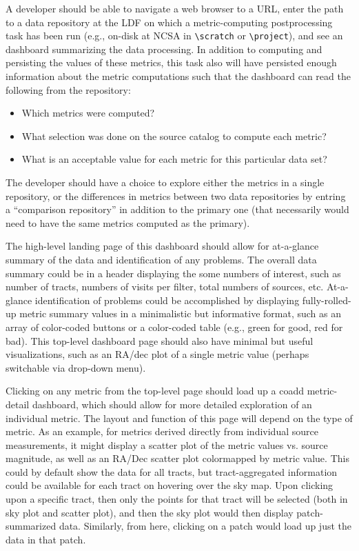 A developer should be able to navigate a web browser to a URL, enter the path to a data repository at the LDF on which a metric-computing postprocessing task has been run (e.g., on-disk at NCSA in \texttt{\textbackslash scratch} or \texttt{\textbackslash project}), and see an dashboard summarizing the data processing.
In addition to computing and persisting the values of these metrics, this task also will have persisted enough information about the metric computations such that the dashboard can read the following from the repository:
\begin{itemize}
    \item Which metrics were computed?
    \item What selection was done on the source catalog to compute each metric?
    \item What is an acceptable value for each metric for this particular data set?
\end{itemize}
The developer should have a choice to explore either the metrics in a single repository, or the differences in metrics between two data repositories by entring a ``comparison repository'' in addition to the primary one (that necessarily would need to have the same metrics computed as the primary).

The high-level landing page of this dashboard should allow for at-a-glance summary of the data and identification of any problems.
The overall data summary could be in a header displaying the some numbers of interest, such as number of tracts, numbers of visits per filter, total numbers of sources, etc.
At-a-glance identification of problems could be accomplished by displaying fully-rolled-up metric summary values in a minimalistic but informative format, such as an array of color-coded buttons or a color-coded table (e.g., green for good, red for bad).
This top-level dashboard page should also have minimal but useful visualizations, such as an RA/dec plot of a single metric value (perhaps switchable via drop-down menu).

Clicking on any metric from the top-level page should load up a coadd metric-detail dashboard, which should allow for more detailed exploration of an individual metric.
The layout and function of this page will depend on the type of metric.
As an example, for metrics derived directly from individual source measurements, it might display a scatter plot of the metric values vs. source magnitude, as well as an RA/Dec scatter plot colormapped by metric value.
This could by default show the data for all tracts, but tract-aggregated information could be available for each tract on hovering over the sky map.
Upon clicking upon a specific tract, then only the points for that tract will be selected (both in sky plot and scatter plot), and then the sky plot would then display patch-summarized data.
Similarly, from here, clicking on a patch would load up just the data in that patch.

